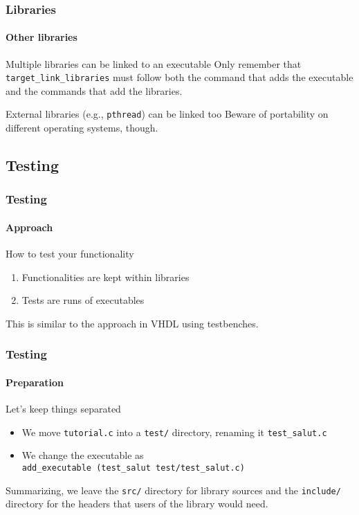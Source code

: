 \begin{frame}
\frametitle{Libraries}
\framesubtitle{Other libraries}

\begin{block}{Multiple libraries can be linked to an executable}
Only remember that \texttt{target\_link\_libraries} must follow both the command that adds the executable and the commands that add the libraries.
\end{block}

\begin{block}{External libraries (e.g., \texttt{pthread}) can be linked too}
Beware of portability on different operating systems, though.
\end{block}

\end{frame}

\subsection{Testing}

\begin{frame}
\frametitle{Testing}
\framesubtitle{Approach}

\begin{block}{How to test your functionality}
\begin{enumerate}
\item Functionalities are kept within libraries
\item Tests are runs of executables
\end{enumerate}
This is similar to the approach in VHDL using testbenches.
\end{block}

\end{frame}

\begin{frame}
\frametitle{Testing}
\framesubtitle{Preparation}

\begin{block}{Let's keep things separated}
\begin{itemize}
\item We move \texttt{tutorial.c} into a \texttt{test/} directory, renaming it \texttt{test\_salut.c}
\item We change the executable as \\ \texttt{add\_executable (test\_salut test/test\_salut.c)}
\end{itemize}
Summarizing, we leave the \texttt{src/} directory for library sources and the \texttt{include/} directory for the headers that users of the library would need.
\end{block}

\end{frame}


